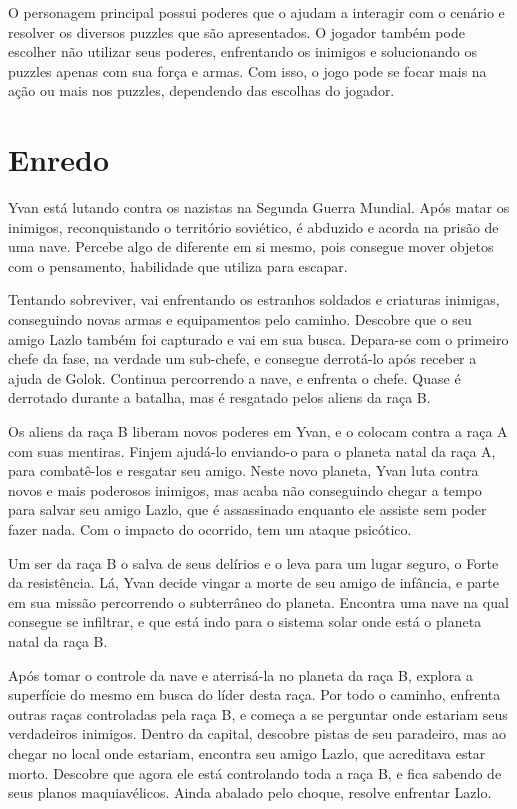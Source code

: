 \documentclass[12pt, a4paper]{article}
\begin{document}
    O personagem principal possui poderes que o ajudam
    a interagir com o cenário e resolver os diversos puzzles que são apresentados.
    O jogador também pode escolher não utilizar seus poderes, enfrentando os inimigos
    e solucionando os puzzles apenas com sua força e armas. Com isso, o jogo pode se
    focar mais na ação ou mais nos puzzles, dependendo das escolhas do jogador.

\section{Enredo}
    Yvan está lutando contra os nazistas na Segunda Guerra Mundial. Após matar
    os inimigos, reconquistando o território soviético, é abduzido e acorda
    na prisão de uma nave. Percebe algo de diferente em si mesmo, pois consegue
    mover objetos com o pensamento, habilidade que utiliza para escapar.

    Tentando sobreviver, vai enfrentando os estranhos soldados e criaturas inimigas,
    conseguindo novas armas e equipamentos pelo caminho. Descobre que o seu amigo 
    Lazlo também foi capturado e vai em sua busca. Depara-se com o primeiro chefe
    da fase, na verdade um sub-chefe, e consegue derrotá-lo após receber a ajuda
    de Golok. Continua percorrendo a nave, e enfrenta o chefe. Quase é derrotado
    durante a batalha, mas é resgatado pelos aliens da raça B.

    Os aliens da raça B liberam novos poderes em Yvan, e o colocam contra a raça A
    com suas mentiras. Finjem ajudá-lo enviando-o para o planeta natal da raça A,
    para combatê-los e resgatar seu amigo. Neste novo planeta, Yvan luta contra
    novos e mais poderosos inimigos, mas acaba não conseguindo chegar a tempo para
    salvar seu amigo Lazlo, que é assassinado enquanto ele assiste sem poder fazer
    nada. Com o impacto do ocorrido, tem um ataque psicótico.

    Um ser da raça B o salva de seus delírios e o leva para um lugar seguro, o Forte
    da resistência. Lá, Yvan decide vingar a morte de seu amigo de infância, e
    parte em sua missão percorrendo o subterrâneo do planeta. Encontra uma nave na
    qual consegue se infiltrar, e que está indo para o sistema solar onde está
    o planeta natal da raça B.

    Após tomar o controle da nave e aterrisá-la no planeta da raça B, explora
    a superfície do mesmo em busca do líder desta raça. Por todo o caminho, enfrenta
    outras raças controladas pela raça B, e começa a se perguntar onde estariam seus
    verdadeiros inimigos. Dentro da capital, descobre pistas de seu paradeiro, mas
    ao chegar no local onde estariam, encontra seu amigo Lazlo, que acreditava estar
    morto. Descobre que agora ele está controlando toda a raça B, e fica sabendo de
    seus planos maquiavélicos. Ainda abalado pelo choque, resolve enfrentar Lazlo.
\end{document}
